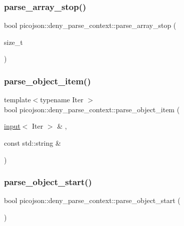\subsubsection{\texorpdfstring{parse\+\_\+array\+\_\+stop()}{parse\_array\_stop()}}
{\footnotesize\ttfamily bool picojson\+::deny\+\_\+parse\+\_\+context\+::parse\+\_\+array\+\_\+stop (\begin{DoxyParamCaption}\item[{size\+\_\+t}]{ }\end{DoxyParamCaption})\hspace{0.3cm}{\ttfamily [inline]}}

\hypertarget{classpicojson_1_1deny__parse__context_a08a8add290a938e71285f7b72a24b91c}{}\label{classpicojson_1_1deny__parse__context_a08a8add290a938e71285f7b72a24b91c} 
\subsubsection{\texorpdfstring{parse\+\_\+object\+\_\+item()}{parse\_object\_item()}}
{\footnotesize\ttfamily template$<$typename Iter $>$ \\
bool picojson\+::deny\+\_\+parse\+\_\+context\+::parse\+\_\+object\+\_\+item (\begin{DoxyParamCaption}\item[{\hyperlink{classpicojson_1_1input}{input}$<$ Iter $>$ \&}]{,  }\item[{const std\+::string \&}]{ }\end{DoxyParamCaption})\hspace{0.3cm}{\ttfamily [inline]}}

\hypertarget{classpicojson_1_1deny__parse__context_a344343a42dca7a25057e35077e517fbf}{}\label{classpicojson_1_1deny__parse__context_a344343a42dca7a25057e35077e517fbf} 
\subsubsection{\texorpdfstring{parse\+\_\+object\+\_\+start()}{parse\_object\_start()}}
{\footnotesize\ttfamily bool picojson\+::deny\+\_\+parse\+\_\+context\+::parse\+\_\+object\+\_\+start (\begin{DoxyParamCaption}{ }\end{DoxyParamCaption})\hspace{0.3cm}{\ttfamily [inline]}}

